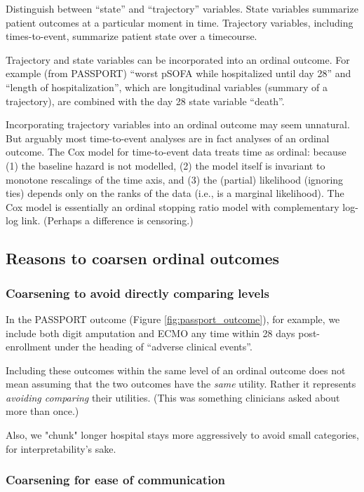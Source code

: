 \documentclass[
  11pt,
  fleqn
]{article}
\begin{document}
Distinguish between ``state'' and ``trajectory'' variables. State
variables summarize patient outcomes at a particular moment in time.
Trajectory variables, including times-to-event, summarize patient
state over a timecourse.

Trajectory and state variables can be incorporated into an ordinal outcome. For
example (from PASSPORT) ``worst pSOFA while hospitalized until day 28'' and
``length of hospitalization'', which are longitudinal variables (summary of a
trajectory), are combined with the day 28 state variable ``death''.

Incorporating trajectory variables into an ordinal outcome may seem unnatural.
But arguably most time-to-event analyses are in fact analyses of an
ordinal outcome. The Cox model for time-to-event data treats time as ordinal:
because (1) the baseline hazard is not modelled, (2) the model itself is
invariant to monotone rescalings of the time axis, and (3) the (partial)
likelihood (ignoring ties) depends only on the ranks of the data (i.e., is a
marginal likelihood). The Cox model is essentially an ordinal
stopping ratio model with complementary log-log link. (Perhaps a
difference is censoring.)

\subsection{Reasons to coarsen ordinal outcomes}

\subsubsection{Coarsening to avoid directly comparing levels}

In the PASSPORT outcome (Figure \ref{fig:passport_outcome}), for
example, we include both digit
amputation and ECMO
any time within 28 days post-enrollment under the heading of
``adverse clinical events''.

Including these outcomes within the same level of an
ordinal outcome does not mean assuming that the two outcomes have the
\emph{same} utility. Rather it represents \emph{avoiding comparing}
their utilities. (This was something clinicians asked about more than once.)

Also, we "chunk" longer hospital stays more aggressively to avoid
small categories, for interpretability's sake.

\subsubsection{Coarsening for ease of communication}
\end{document}
